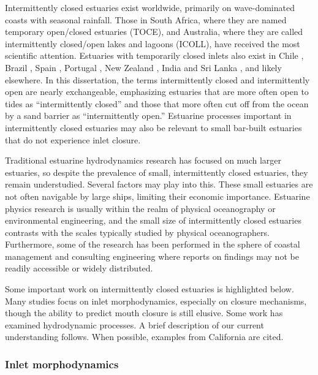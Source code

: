 Intermittently closed estuaries exist worldwide, primarily on wave-dominated coasts with seasonal rainfall. Those in South Africa, where they are named temporary open/closed estuaries (TOCE), and Australia, where they are called intermittently closed/open lakes and lagoons (ICOLL), have received the most scientific attention. Estuaries with temporarily closed inlets also exist in Chile \parencite{dussaillant_water_2009}, Brazil \parencite{suzuki_effects_1998}, Spain \parencite{moreno_morphodynamics_2010}, Portugal \parencite{fortunato_morphological_2014}, New Zealand \parencite{schallenberg_contrasting_2010}, India and Sri Lanka \parencite{ranasinghe_seasonal_2003}, and likely elsewhere. In this dissertation, the terms intermittently closed and intermittently open are nearly exchangeable, emphasizing estuaries that are more often open to tides as ``intermittently closed'' and those that more often cut off from the ocean by a sand barrier as ``intermittently open.'' Estuarine processes important in intermittently closed estuaries may also be relevant to small bar-built estuaries that do not experience inlet closure. 

Traditional estuarine hydrodynamics research has focused on much larger estuaries, so despite the prevalence of small, intermittently closed estuaries, they remain understudied.  Several factors may play into this. These small estuaries are not often navigable by large ships, limiting their economic importance. Estuarine physics research is usually within the realm of physical oceanography or environmental engineering, and the small size of intermittently closed estuaries contrasts with the scales typically studied by physical oceanographers. Furthermore, some of the research has been performed in the sphere of coastal management and consulting engineering where reports on findings may not be readily accessible or widely distributed.

Some important work on intermittently closed estuaries is highlighted below. Many studies focus on inlet morphodynamics, especially on closure mechanisms, though the ability to predict mouth closure is still elusive. Some work has examined hydrodynamic processes. A brief description of our current understanding follows. When possible, examples from California are cited.

\subsubsection{Inlet morphodynamics}

